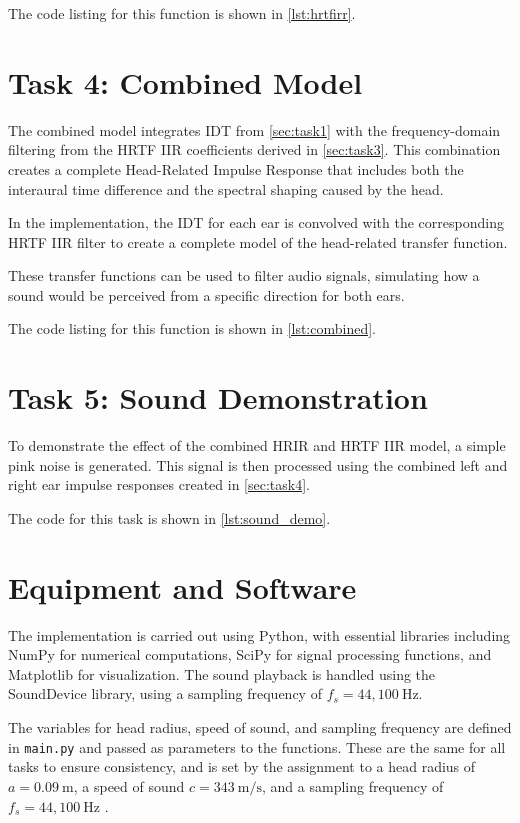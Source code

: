 The code listing for this function is shown in \autoref{lst:hrtfirr}.

\section{Task 4: Combined Model}
\label{sec:task4}

The combined model integrates IDT from \autoref{sec:task1} with the frequency-domain filtering from the HRTF IIR coefficients derived in \autoref{sec:task3}. This combination creates a complete Head-Related Impulse Response that includes both the interaural time difference and the spectral shaping caused by the head.

In the implementation, the IDT for each ear is convolved with the corresponding HRTF IIR filter to create a complete model of the head-related transfer function.

These transfer functions can be used to filter audio signals, simulating how a sound would be perceived from a specific direction for both ears.

The code listing for this function is shown in \autoref{lst:combined}.

\section{Task 5: Sound Demonstration}
\label{sec:task5}

To demonstrate the effect of the combined HRIR and HRTF IIR model, a simple pink noise is generated. This signal is then processed using the combined left and right ear impulse responses created in \autoref{sec:task4}.

The code for this task is shown in \autoref{lst:sound_demo}.

\section{Equipment and Software}
\label{sec:equipment_software}

The implementation is carried out using Python, with essential libraries including NumPy for numerical computations, SciPy for signal processing functions, and Matplotlib for visualization. The sound playback is handled using the SoundDevice library, using a sampling frequency of \( f_s = 44{,}100~\mathrm{Hz} \).

The variables for head radius, speed of sound, and sampling frequency are defined in \texttt{main.py} and passed as parameters to the functions. These are the same for all tasks to ensure consistency, and is set by the assignment to a head radius of \( a = 0.09~\mathrm{m} \), a speed of sound \( c = 343~\mathrm{m/s} \), and a sampling frequency of \( f_s = 44{,}100~\mathrm{Hz} \) \cite{Svensson2025}.
